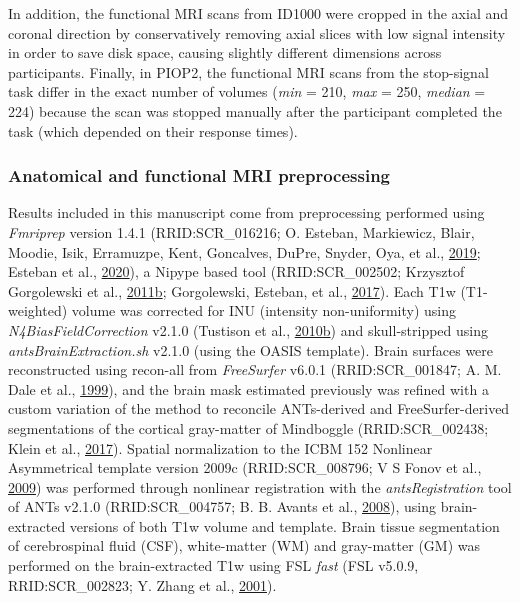 \documentclass[11pt,american,]{memoir} %
\begin{document}
In addition, the functional MRI scans from ID1000 were cropped in the axial and coronal direction by conservatively removing axial slices with low signal intensity in order to save disk space, causing slightly different dimensions across participants. Finally, in PIOP2, the functional MRI scans from the stop-signal task differ in the exact number of volumes (\emph{min} = 210, \emph{max} = 250, \emph{median} = 224) because the scan was stopped manually after the participant completed the task (which depended on their response times).

\hypertarget{anatomical-and-functional-mri-preprocessing}{%
\subsubsection{Anatomical and functional MRI preprocessing}\label{anatomical-and-functional-mri-preprocessing}}

Results included in this manuscript come from preprocessing performed using \emph{Fmriprep} version 1.4.1 (RRID:SCR\_016216; O. Esteban, Markiewicz, Blair, Moodie, Isik, Erramuzpe, Kent, Goncalves, DuPre, Snyder, Oya, et al., \protect\hyperlink{ref-Esteban2019-ri}{2019}; Esteban et al., \protect\hyperlink{ref-Esteban2020-qw}{2020}), a Nipype based tool (RRID:SCR\_002502; Krzysztof Gorgolewski et al., \protect\hyperlink{ref-Gorgolewski2011-aa}{2011}\protect\hyperlink{ref-Gorgolewski2011-aa}{b}; Gorgolewski, Esteban, et al., \protect\hyperlink{ref-Gorgolewski2017-gb}{2017}). Each T1w (T1-weighted) volume was corrected for INU (intensity non-uniformity) using \emph{N4BiasFieldCorrection} v2.1.0 (Tustison et al., \protect\hyperlink{ref-Tustison2010-tk}{2010}\protect\hyperlink{ref-Tustison2010-tk}{b}) and skull-stripped using \emph{antsBrainExtraction.sh} v2.1.0 (using the OASIS template). Brain surfaces were reconstructed using recon-all from \emph{FreeSurfer} v6.0.1 (RRID:SCR\_001847; A. M. Dale et al., \protect\hyperlink{ref-Dale1999-rk}{1999}), and the brain mask estimated previously was refined with a custom variation of the method to reconcile ANTs-derived and FreeSurfer-derived segmentations of the cortical gray-matter of Mindboggle (RRID:SCR\_002438; Klein et al., \protect\hyperlink{ref-Klein2017-su}{2017}). Spatial normalization to the ICBM 152 Nonlinear Asymmetrical template version 2009c (RRID:SCR\_008796; V S Fonov et al., \protect\hyperlink{ref-Fonov2009-sr}{2009}) was performed through nonlinear registration with the \emph{antsRegistration} tool of ANTs v2.1.0 (RRID:SCR\_004757; B. B. Avants et al., \protect\hyperlink{ref-Avants2008-bv}{2008}), using brain-extracted versions of both T1w volume and template. Brain tissue segmentation of cerebrospinal fluid (CSF), white-matter (WM) and gray-matter (GM) was performed on the brain-extracted T1w using FSL \emph{fast} (FSL v5.0.9, RRID:SCR\_002823; Y. Zhang et al., \protect\hyperlink{ref-Zhang2001-wa}{2001}).
\end{document}
